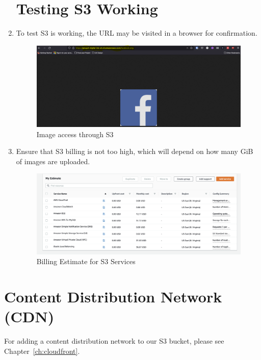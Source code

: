 \begin{enumerate}
    \section{Testing S3 Working}

    \item To test S3 is working, the URL may be visited in a browser for confirmation.\nolinebreak
        \begin{figure}[H]
            \centering
            \includegraphics[width=\textwidth]{resources/s3/s3-image-displayed.png}
            \caption{Image access through S3}
            \label{fig:s3-image}
        \end{figure}


    \item Ensure that S3 billing is not too high, which will depend on how many GiB of images are uploaded.\nolinebreak
        \begin{figure}[H]
            \centering
            \includegraphics[width=\textwidth]{resources/s3/Screenshot 2022-05-14 at 6.45.18 pm.png}
            \caption{Billing Estimate for S3 Services}
            \label{fig:s3-billing}
        \end{figure}
\end{enumerate}

\section{Content Distribution Network (CDN)}
For adding a content distribution network to our S3 bucket, please see Chapter~\ref{ch:cloudfront}.

